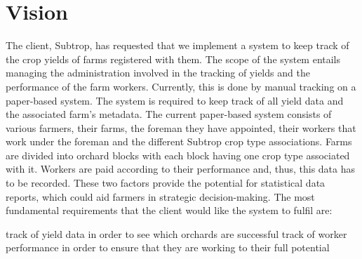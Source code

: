 \documentclass[11pt,fleqn]{book} %
\begin{document}
	
	\chapter{Vision}
		The client, Subtrop, has requested that we implement a system to keep track of the crop yields of farms registered with them. The scope of the system entails managing the administration involved in the tracking of yields and the performance of the farm workers. Currently, this is done by manual tracking on a paper-based system. The system is required to keep track of all yield data and the associated farm’s metadata.\newline
		The current paper-based system consists of various farmers, their farms, the foreman they have appointed, their workers that work under the foreman and the different Subtrop crop type associations. Farms are divided into orchard blocks with each block having one crop type associated with it. Workers are paid according to their performance and, thus, this data has to be recorded. These two factors provide the potential for statistical data reports, which could aid farmers in strategic decision-making.\newline
		The most fundamental requirements that the client would like the system to fulfil are:
	\begin{itemize}
	\itemKeeping track of yield data in order to see which orchards are successful
	\itemKeeping track of worker performance in order to ensure that they are working to their full potential
	\end{itemize}

	
	
	
\end{document}
